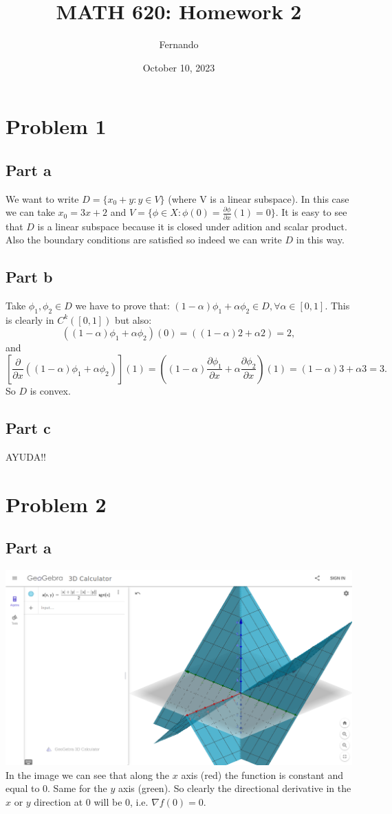 \documentclass{article}
\title{MATH 620: Homework 2}
\author{Fernando}
\date{October 10, 2023}
\begin{document}
\maketitle
\section{Problem 1}
\subsection{Part a}
We want to write $D=\{x_0+y: y\in V\}$ (where V is a linear subspace).
In this case we can take $x_0=3x+2$ and $V=\{\phi\in X:
\phi(0)=\frac{\partial\phi}{\partial x}(1)=0\}$. It
is easy to see that $D$ is a linear subspace because it is closed under adition
and scalar product. Also the boundary conditions are satisfied so indeed we can
write $D$ in this way.
\subsection{Part b}
Take $\phi_1,\phi_2\in D$ we have to prove that:
$(1-\alpha)\phi_1+\alpha \phi_2 \in D,\forall \alpha \in [0,1]$.
This is clearly in $C^k([0,1])$ but also:
\[
\left((1-\alpha)\phi_1+\alpha\phi_2\right)(0)
=\left((1-\alpha)2+\alpha2\right)=2,
\]
and
\[
\left[\frac{\partial}{\partial x}\left((1-\alpha)\phi_1+\alpha \phi_2\right)\right](1)= 
\left((1-\alpha)\frac{\partial \phi_1}{\partial x}+\alpha\frac{\partial
\phi_2}{\partial x}\right)(1) = (1-\alpha)3+\alpha 3=3.
\]
So $D$ is convex.
\subsection{Part c}
AYUDA!!
\section{Problem 2}
\subsection{Part a}
\includegraphics[width=\textwidth]{minsign.png}
In the image we can see that along the $x$ axis (red) the function is constant
and equal to 0. Same for the $y$ axis (green). So clearly the directional
derivative in the $x$ or $y$ direction at 0 will be 0, i.e. $\nabla f(0) =0$.
\end{document}
